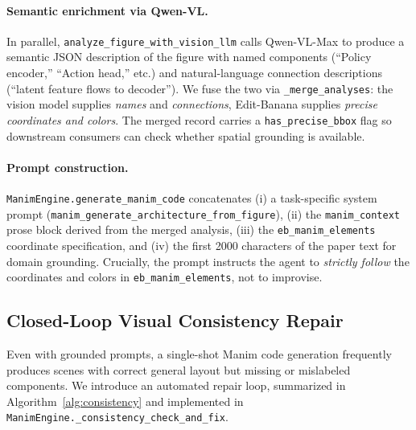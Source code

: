 \documentclass[11pt,a4paper]{article}
\begin{document}
\paragraph{Semantic enrichment via Qwen-VL.}
In parallel, \texttt{analyze\_figure\_with\_vision\_llm} calls Qwen-VL-Max to produce a semantic JSON description of the figure with named components (``Policy encoder,'' ``Action head,'' etc.) and natural-language connection descriptions (``latent feature flows to decoder''). We fuse the two via \texttt{\_merge\_analyses}: the vision model supplies \emph{names} and \emph{connections}, Edit-Banana supplies \emph{precise coordinates and colors}. The merged record carries a \texttt{has\_precise\_bbox} flag so downstream consumers can check whether spatial grounding is available.

\paragraph{Prompt construction.}
\texttt{ManimEngine.generate\_manim\_code} concatenates (i) a task-specific system prompt (\texttt{manim\_generate\_architecture\_from\_figure}), (ii) the \texttt{manim\_context} prose block derived from the merged analysis, (iii) the \texttt{eb\_manim\_elements} coordinate specification, and (iv) the first 2000 characters of the paper text for domain grounding. Crucially, the prompt instructs the agent to \emph{strictly follow} the coordinates and colors in \texttt{eb\_manim\_elements}, not to improvise.

\subsection{Closed-Loop Visual Consistency Repair}
\label{sec:method:loop}

Even with grounded prompts, a single-shot Manim code generation frequently produces scenes with correct general layout but missing or mislabeled components. We introduce an automated repair loop, summarized in Algorithm~\ref{alg:consistency} and implemented in \texttt{ManimEngine.\_consistency\_check\_and\_fix}.
\end{document}
